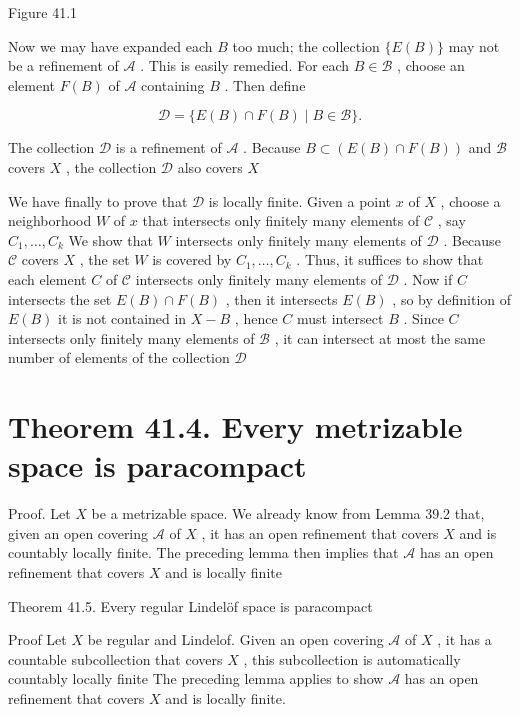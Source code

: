 \documentclass[10pt]{article}
\begin{document}
Figure 41.1

Now we may have expanded each \(B\) too much; the collection \(\{ E\left( B\right) \}\) may not be a refinement of \(\mathcal{A}\) . This is easily remedied. For each \(B \in  \mathcal{B}\) , choose an element \(F\left( B\right)\) of \(\mathcal{A}\) containing \(B\) . Then define

\[
\mathcal{D} = \{ E\left( B\right)  \cap  F\left( B\right)  \mid  B \in  \mathcal{B}\} .
\]

The collection \(\mathcal{D}\) is a refinement of \(\mathcal{A}\) . Because \(B \subset  \left( {E\left( B\right)  \cap  F\left( B\right) }\right)\) and \(\mathcal{B}\) covers \(X\) , the collection \(\mathcal{D}\) also covers \(X\)

We have finally to prove that \(\mathcal{D}\) is locally finite. Given a point \(x\) of \(X\) , choose a neighborhood \(W\) of \(x\) that intersects only finitely many elements of \(\mathcal{C}\) , say \({C}_{1},\ldots ,{C}_{k}\) We show that \(W\) intersects only finitely many elements of \(\mathcal{D}\) . Because \(\mathcal{C}\) covers \(X\) , the set \(W\) is covered by \({C}_{1},\ldots ,{C}_{k}\) . Thus, it suffices to show that each element \(C\) of \(\mathcal{C}\) intersects only finitely many elements of \(\mathcal{D}\) . Now if \(C\) intersects the set \(E\left( B\right)  \cap  F\left( B\right)\) , then it intersects \(E\left( B\right)\) , so by definition of \(E\left( B\right)\) it is not contained in \(X - B\) , hence \(C\) must intersect \(B\) . Since \(C\) intersects only finitely many elements of \(\mathcal{B}\) , it can intersect at most the same number of elements of the collection \(\mathcal{D}\)

\section*{Theorem 41.4. Every metrizable space is paracompact}

Proof. Let \(X\) be a metrizable space. We already know from Lemma 39.2 that, given an open covering \(\mathcal{A}\) of \(X\) , it has an open refinement that covers \(X\) and is countably locally finite. The preceding lemma then implies that \(\mathcal{A}\) has an open refinement that covers \(X\) and is locally finite

Theorem 41.5. Every regular Lindelöf space is paracompact

Proof Let \(X\) be regular and Lindelof. Given an open covering \(\mathcal{A}\) of \(X\) , it has a countable subcollection that covers \(X\) , this subcollection is automatically countably locally finite The preceding lemma applies to show \(\mathcal{A}\) has an open refinement that covers \(X\) and is locally finite.
\end{document}
